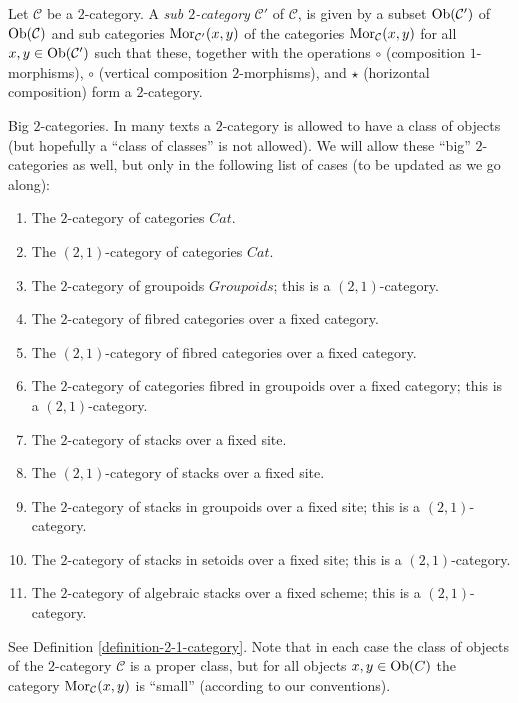 \begin{definition}
\label{definition-sub-2-category}
Let $\mathcal{C}$ be a $2$-category.
A {\it sub $2$-category} $\mathcal{C}'$ of $\mathcal{C}$, is given by a subset
$\mathop{\mathrm{Ob}}\nolimits(\mathcal{C}')$ of $\mathop{\mathrm{Ob}}\nolimits(\mathcal{C})$
and sub categories $\mathop{\mathrm{Mor}}\nolimits_{\mathcal{C}'}(x, y)$ of the
categories $\mathop{\mathrm{Mor}}\nolimits_\mathcal{C}(x, y)$ for all
$x, y \in \mathop{\mathrm{Ob}}\nolimits(\mathcal{C}')$ such that these, together with
the operations $\circ$ (composition $1$-morphisms), $\circ$ (vertical
composition $2$-morphisms), and $\star$ (horizontal composition)
form a $2$-category.
\end{definition}

\begin{remark}
\label{remark-big-2-categories}
Big $2$-categories.
In many texts a $2$-category is allowed to have a class of
objects (but hopefully a ``class of classes'' is not allowed).
We will allow these ``big'' $2$-categories as well, but only
in the following list of cases (to be updated as we go along):
\begin{enumerate}
\item The $2$-category of categories $\textit{Cat}$.
\item The $(2, 1)$-category of categories $\textit{Cat}$.
\item The $2$-category of groupoids $\textit{Groupoids}$;
this is a $(2, 1)$-category.
\item The $2$-category of fibred categories over a fixed category.
\item The $(2, 1)$-category of fibred categories over a fixed category.
\item The $2$-category of categories fibred in groupoids over a fixed category;
this is a $(2, 1)$-category.
\item The $2$-category of stacks over a fixed site.
\item The $(2, 1)$-category of stacks over a fixed site.
\item The $2$-category of stacks in groupoids over a fixed site;
this is a $(2, 1)$-category.
\item The $2$-category of stacks in setoids over a fixed site;
this is a $(2, 1)$-category.
\item The $2$-category of algebraic stacks over a fixed scheme;
this is a $(2, 1)$-category.
\end{enumerate}
See Definition \ref{definition-2-1-category}.
Note that in each case the class of objects of the $2$-category
$\mathcal{C}$ is a proper class, but for all objects $x, y \in \mathop{\mathrm{Ob}}\nolimits(C)$
the category $\mathop{\mathrm{Mor}}\nolimits_\mathcal{C}(x, y)$ is ``small'' (according to
our conventions).
\end{remark}

